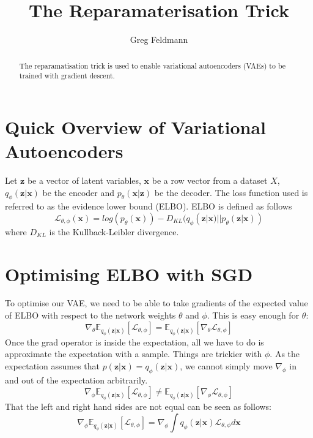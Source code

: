 \documentclass[]{article}
\title{The Reparamaterisation Trick}
\author{Greg Feldmann}
\begin{document}
\maketitle

\begin{abstract}
The reparamatisation trick is used to enable variational autoencoders (VAEs) to be trained with gradient descent.
\end{abstract}

\section{Quick Overview of Variational Autoencoders}
Let $\mathbf{z}$ be a vector of latent variables, $\mathbf{x}$ be a row vector from a dataset $X$, $q_{\phi}(\mathbf{z}|\mathbf{x})$ be the encoder and $p_{\theta}(\mathbf{x}|\mathbf{z})$ be the decoder. The loss function used is referred to as the evidence lower bound (ELBO). ELBO is defined as follows
\begin{equation} \mathcal{L}_{\theta, \phi}(\mathbf{x}) = log(p_{\theta}(\mathbf{x})) - D_{KL}(q_{\phi}(\mathbf{z}|\mathbf{x})||p_{\theta}(\mathbf{z}|\mathbf{x}))\end{equation}
where $D_{KL}$ is the Kullback-Leibler divergence.

\section{Optimising ELBO with SGD}
To optimise our VAE, we need to be able to take gradients of the expected value of ELBO with respect to the network weights $\theta$ and $\phi$. This is easy enough for $\theta$:
\begin{equation} \nabla_{\theta}\mathbb{E}_{q_{\phi}(\mathbf{z}|\mathbf{x})}[\mathcal{L}_{\theta, \phi}] = \mathbb{E}_{q_{\phi}(\mathbf{z}|\mathbf{x})}[\nabla_{\theta} \mathcal{L}_{\theta, \phi}]
\end{equation}
Once the grad operator is inside the expectation, all we have to do is approximate the expectation with a sample. 
\newline
\newline
Things are trickier with $\phi$. As the expectation assumes that $p(\mathbf{z}|\mathbf{x}) = q_{\phi}(\mathbf{z}|\mathbf{x})$, we cannot simply move $\nabla_{\phi}$ in and out of the expectation arbitrarily.
\begin{equation} \nabla_{\phi}\mathbb{E}_{q_{\phi}(\mathbf{z}|\mathbf{x})}[\mathcal{L}_{\theta, \phi}] \neq \mathbb{E}_{q_{\phi}(\mathbf{z}|\mathbf{x})}[\nabla_{\phi} \mathcal{L}_{\theta, \phi}]
\end{equation}
That the left and right hand sides are not equal can be seen as follows:
\begin{equation} \nabla_{\phi}\mathbb{E}_{q_{\phi}(\mathbf{z}|\mathbf{x})}[\mathcal{L}_{\theta, \phi}] = \nabla_{\phi} \int q_{\phi}(\mathbf{z}|\mathbf{x}) \mathcal{L}_{\theta, \phi} d\mathbf{x}
\end{equation}
\end{document}
